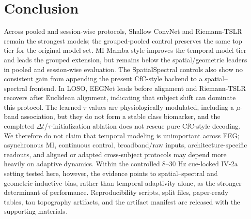 \documentclass[journal]{IEEEtran}
\begin{document}
\section{Conclusion}

Across pooled and session-wise protocols, Shallow ConvNet and Riemann-TSLR remain the strongest models; the grouped-pooled control preserves the same top tier for the original model set. MI-Mamba-style improves the temporal-model tier and leads the grouped extension, but remains below the spatial/geometric leaders in pooled and session-wise evaluation. The SpatialSpectral controls also show no consistent gain from appending the present CfC-style backend to a spatial--spectral frontend. In LOSO, EEGNet leads before alignment and Riemann-TSLR recovers after Euclidean alignment, indicating that subject shift can dominate this protocol. The learned $\tau$ values are physiologically modulated, including a $\mu$-band association, but they do not form a stable class biomarker, and the completed $\Delta t$/$\tau$-initialization ablation does not rescue pure CfC-style decoding. We therefore do not claim that temporal modeling is unimportant across EEG; asynchronous MI, continuous control, broadband/raw inputs, architecture-specific readouts, and aligned or adapted cross-subject protocols may depend more heavily on adaptive dynamics. Within the controlled 8--30 Hz cue-locked IV-2a setting tested here, however, the evidence points to spatial--spectral and geometric inductive bias, rather than temporal adaptivity alone, as the stronger determinant of performance. Reproducibility scripts, split files, paper-ready tables, tau topography artifacts, and the artifact manifest are released with the supporting materials.

\begingroup
\scriptsize


\endgroup
\end{document}
